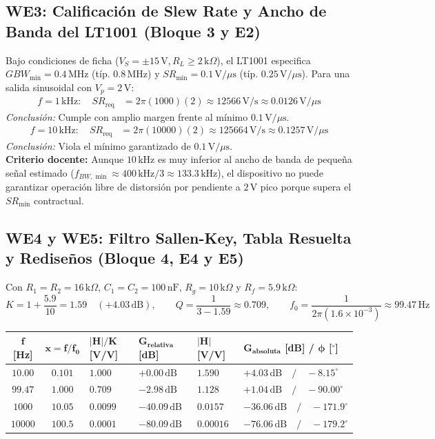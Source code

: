 \documentclass[11pt, a4paper]{article}
\begin{document}
\subsection*{WE3: Calificación de Slew Rate y Ancho de Banda del LT1001 (Bloque 3 y E2)}
Bajo condiciones de ficha ($V_S = \pm 15\,\text{V}, R_L \ge 2\,\text{k}\Omega$), el LT1001 especifica $GBW_{\min} = 0.4\,\text{MHz}$ (típ. $0.8\,\text{MHz}$) y $SR_{\min} = 0.1\,\text{V/}\mu\text{s}$ (típ. $0.25\,\text{V/}\mu\text{s}$). Para una salida sinusoidal con $V_p = 2\,\text{V}$:
\begin{align*}
    f = 1\,\text{kHz}: \quad SR_{\text{req}} &= 2\pi(1000)(2) \approx 12566\,\text{V/s} \approx 0.0126\,\text{V/}\mu\text{s}
\end{align*}
\textit{Conclusión:} Cumple con amplio margen frente al mínimo $0.1\,\text{V/}\mu\text{s}$.
\begin{align*}
    f = 10\,\text{kHz}: \quad SR_{\text{req}} &= 2\pi(10000)(2) \approx 125664\,\text{V/s} \approx 0.1257\,\text{V/}\mu\text{s} 
\end{align*}
\textit{Conclusión:} Viola el mínimo garantizado de $0.1\,\text{V/}\mu\text{s}$. \\
\textbf{Criterio docente:} Aunque $10\,\text{kHz}$ es muy inferior al ancho de banda de pequeña señal estimado ($f_{BW,\min} \approx 400\,\text{kHz}/3 \approx 133.3\,\text{kHz}$), el dispositivo no puede garantizar operación libre de distorsión por pendiente a $2\,\text{V}$ pico porque supera el $SR_{\min}$ contractual.

\subsection*{WE4 y WE5: Filtro Sallen-Key, Tabla Resuelta y Rediseños (Bloque 4, E4 y E5)}
Con $R_1 = R_2 = 16\,\text{k}\Omega$, $C_1 = C_2 = 100\,\text{nF}$, $R_g = 10\,\text{k}\Omega$ y $R_f = 5.9\,\text{k}\Omega$:
\[
    K = 1 + \frac{5.9}{10} = 1.59 \quad (+4.03\,\text{dB}), \qquad Q = \frac{1}{3 - 1.59} \approx 0.709, \qquad f_0 = \frac{1}{2\pi(1.6\times 10^{-3})} \approx 99.47\,\text{Hz}
\]

\begin{center}
\footnotesize
\begin{tabularx}{\textwidth}{@{} c c X X X X @{}}
\toprule
$\bm{f}$ \textbf{[Hz]} & $\bm{x = f/f_0}$ & $\bm{|H|/K}$ \textbf{[V/V]} & $\bm{G_{\text{relativa}}}$ \textbf{[dB]} & $\bm{|H|}$ \textbf{[V/V]} & $\bm{G_{\text{absoluta}}}$ \textbf{[dB]} / $\bm{\phi}$ \textbf{[$^\circ$]} \\ \midrule
$10.00$ & $0.101$ & $1.000$ & $+0.00\,\text{dB}$ & $1.590$ & $+4.03\,\text{dB} \quad / \quad -8.15^\circ$ \\
$99.47$ & $1.000$ & $0.709$ & $-2.98\,\text{dB}$ & $1.128$ & $+1.04\,\text{dB} \quad / \quad -90.00^\circ$ \\
$1000$ & $10.05$ & $0.0099$ & $-40.09\,\text{dB}$ & $0.0157$ & $-36.06\,\text{dB} \quad / \quad -171.9^\circ$ \\
$10000$ & $100.5$ & $0.0001$ & $-80.09\,\text{dB}$ & $0.00016$ & $-76.06\,\text{dB} \quad / \quad -179.2^\circ$ \\ \bottomrule
\end{tabularx}
\end{center}
\end{document}
